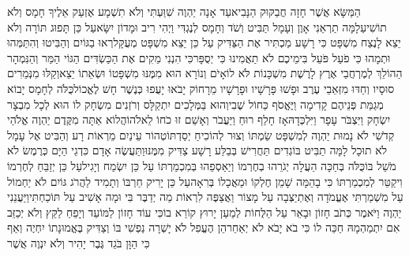 \documentclass[../main/main.tex]{subfiles}
\begin{document}
\pagebreak
{}
\begin{multicols*}{\ncols}
הַמַּשָּׂא אֲשֶׁר חָזָה חֲבַקּוּק הַנָּבִיא\PreVerseSpace{}עַד אָנָה יַהְוֶה שִׁוַּעְתִּי וְלֹא תִשְׁמָע אֶזְעַק אֵלֶיךָ חָמָס וְלֹא תוֹשִׁיעַ\PreVerseSpace{}לָמָּה תַרְאֵנִי אָוֶן וְעָמָל תַּבִּיט וְשֹׁד וְחָמָס לְנֶגְדִּי וַיְהִי רִיב וּמָדוֹן יִשָּׂא\PreVerseSpace{}עַל כֵּן תָּפוּג תּוֹרָה וְלֹא יֵצֵא לָנֶצַח מִשְׁפָּט כִּי רָשָׁע מַכְתִּיר אֶת הַצַּדִּיק עַל כֵּן יֵצֵא מִשְׁפָּט מְעֻקָּל\PreVerseSpace{}רְאוּ בַגּוֹיִם וְהַבִּיטוּ וְהִתַּמְּהוּ וּתְמָהוּ\SubEnd{} כִּי פֹעַל פֹּעֵל בִּימֵיכֶם לֹא תַאֲמִינוּ כִּי יְסֻפָּר\PreVerseSpace{}כִּי הִנְנִי מֵקִים אֶת הַכַּשְׂדִּים הַגּוֹי הַמַּר וְהַנִּמְהָר הַהוֹלֵךְ לְמֶרְחֲבֵי אֶרֶץ לָרֶשֶׁת מִשְׁכָּנוֹת לֹּא לוֹ\PreVerseSpace{}אָיֹם וְנוֹרָא הוּא מִמֶּנּוּ מִשְׁפָּטוֹ וּשְׂאֵתוֹ יֵצֵא\PreVerseSpace{}וְקַלּוּ מִנְּמֵרִים סוּסָיו וְחַדּוּ מִזְּאֵבֵי עֶרֶב וּפָשׁוּ פָּרָשָׁיו וּפָרָשָׁיו מֵרָחוֹק יָבֹאוּ יָעֻפוּ כְּנֶשֶׁר חָשׁ לֶאֱכוֹל\PreVerseSpace{}כֻּלֹּה לְחָמָס יָבוֹא מְגַמַּת פְּנֵיהֶם קָדִימָה וַיֶּאֱסֹף כַּחוֹל שֶׁבִי\PreVerseSpace{}וְהוּא בַּמְּלָכִים יִתְקַלָּס וְרֹזְנִים מִשְׂחָק לוֹ הוּא לְכָל מִבְצָר יִשְׂחָק וַיִּצְבֹּר עָפָר וַיִּלְכְּדָהּ\PreVerseSpace{}אָז חָלַף רוּחַ וַיַּעֲבֹר וְאָשֵׁם זוּ כֹחוֹ לֵאלֹהוֹ\PreVerseSpace{}הֲלוֹא אַתָּה מִקֶּדֶם יַהְוֶה אֱלֹהַי קְדֹשִׁי לֹא נָמוּת יַהְוֶה לְמִשְׁפָּט שַׂמְתּוֹ וְצוּר לְהוֹכִיחַ יְסַדְתּוֹ\PreVerseSpace{}טְהוֹר עֵינַיִם מֵרְאוֹת רָע וְהַבִּיט אֶל עָמָל לֹא תוּכָל לָמָּה תַבִּיט בּוֹגְדִים תַּחֲרִישׁ בְּבַלַּע רָשָׁע צַדִּיק מִמֶּנּוּ\PreVerseSpace{}וַתַּעֲשֶׂה אָדָם כִּדְגֵי הַיָּם כְּרֶמֶשׂ לֹא מֹשֵׁל בּוֹ\PreVerseSpace{}כֻּלֹּה בְּחַכָּה הֵעֲלָה יְגֹרֵהוּ בְחֶרְמוֹ וְיַאַסְפֵהוּ בְּמִכְמַרְתּוֹ עַל כֵּן יִשְׂמַח וְיָגִיל\PreVerseSpace{}עַל כֵּן יְזַבֵּחַ לְחֶרְמוֹ וִיקַטֵּר לְמִכְמַרְתּוֹ כִּי בָהֵמָּה שָׁמֵן חֶלְקוֹ וּמַאֲכָלוֹ בְּרִאָה\PreVerseSpace{}עַל\SubEnd{} כֵּן יָרִיק חַרְבּוֹ\SubEnd{} וְתָמִיד לַהֲרֹג גּוֹיִם לֹא יַחְמוֹל \ClosedSection{}עַל מִשְׁמַרְתִּי אֶעֱמֹדָה וְאֶתְיַצְּבָה עַל מָצוֹר וַאֲצַפֶּה לִרְאוֹת מַה יְדַבֶּר בִּי וּמָה אָשִׁיב עַל תּוֹכַחְתִּי\PreVerseSpace{}וַיַּעֲנֵנִי יַהְוֶה וַיֹּאמֶר כְּתֹב חָזוֹן וּבָאֵר עַל הַלֻּחוֹת לְמַעַן יָרוּץ קוֹרֵא בוֹ\PreVerseSpace{}כִּי עוֹד חָזוֹן לַמּוֹעֵד וְיָפֵחַ לַקֵּץ וְלֹא יְכַזֵּב אִם יִתְמַהְמָהּ חַכֵּה לוֹ כִּי בֹא יָבֹא לֹא יְאַחֵר\PreVerseSpace{}הֵן הֶעֱפִל\SubEnd{} לֹא יָשְׁרָה נַפְשִׁי\SubEnd{} בּוֹ וְצַדִּיק בֶּאֱמוּנָתוֹ יִחְיֶה \ClosedSection{}וְאַף כִּי הַוָּן\SubEnd{} בֹּגֵד גֶּבֶר יָהִיר וְלֹא יִנְוֶה אֲשֶׁר 
\end{multicols*}
\end{document}
